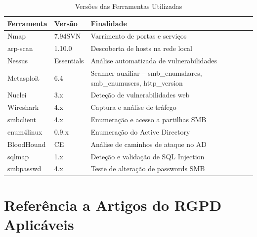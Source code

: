 \documentclass[12pt, a4paper]{report}
\newcommand{\thead}[1]{\bfseries\small\color{white}#1}
\begin{document}
\begin{table}[H]
\centering
\caption{Versões das Ferramentas Utilizadas}
\begin{tabularx}{\linewidth}{l l X}
\toprule
\rowcolor{TableHead}
\thead{Ferramenta} & \thead{Versão} & \thead{Finalidade} \\
\midrule
Nmap            & 7.94SVN    & Varrimento de portas e serviços \\
\rowcolor{TableAlt}
arp-scan        & 1.10.0     & Descoberta de hosts na rede local \\
Nessus          & Essentials & Análise automatizada de vulnerabilidades \\
\rowcolor{TableAlt}
Metasploit      & 6.4        & Scanner auxiliar -- smb\_enumshares, smb\_enumusers, http\_version \\
Nuclei          & 3.x        & Deteção de vulnerabilidades web \\
\rowcolor{TableAlt}
Wireshark       & 4.x        & Captura e análise de tráfego \\
smbclient       & 4.x        & Enumeração e acesso a partilhas SMB \\
\rowcolor{TableAlt}
enum4linux      & 0.9.x      & Enumeração do Active Directory \\
BloodHound      & CE         & Análise de caminhos de ataque no AD \\
\rowcolor{TableAlt}
sqlmap          & 1.x        & Deteção e validação de SQL Injection \\
smbpasswd       & 4.x        & Teste de alteração de passwords SMB \\
\bottomrule
\end{tabularx}
\end{table}

\section{Referência a Artigos do RGPD Aplicáveis}
\end{document}
